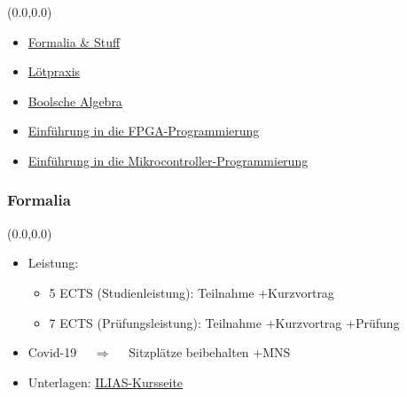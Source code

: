 \documentclass[aspectratio=169, 14pt]{beamer}
\begin{document}
\begin{frame}[label=inhalt]
    \begin{textblock*}{2\paperwidth}(0.0\paperwidth,0.0\paperheight)
        \vspace*{1.9cm}
        \begin{itemize}
            \setlength\itemsep{16pt}
            \item \hyperlink{stuff}{Formalia \& Stuff}
            \item \hyperlink{loetuebung}{Lötpraxis}
            \item \hyperlink{boolschealgebra}{Boolsche Algebra}
            \item \hyperlink{fpga}{Einführung in die FPGA-Programmierung}
            \item \hyperlink{mikrocontroller}{Einführung in die Mikrocontroller-Programmierung}
        \end{itemize}
    \end{textblock*}
    \setcounter{framenumber}{0}
\end{frame}


\begin{frame}[label=stuff]
    \addtocounter{framenumber}{-1}
\end{frame}


\begin{frame}
    \frametitle{Formalia}
    \begin{textblock*}{2\paperwidth}(0.0\paperwidth,0.0\paperheight)
        \vspace*{2.0cm}
        \begin{itemize}
            \setlength\itemsep{16pt}
            \item Leistung:
            \begin{itemize}
                \item 5 ECTS (Studienleistung): Teilnahme +Kurzvortrag
                \item 7 ECTS (Prüfungsleistung): Teilnahme +Kurzvortrag +Prüfung
            \end{itemize}
            \item Covid-19 $\quad\Rightarrow\quad$ Sitzplätze beibehalten +MNS
            \item Unterlagen: \textcolor{uniblau}{\href{https://ilias.uni-freiburg.de/ilias.php?ref_id=2285967&cmdClass=ilrepositorygui&cmdNode=yj&baseClass=ilrepositorygui}{ILIAS-Kursseite}}
        \end{itemize}
    \end{textblock*}
    \framenumber
\end{frame}
\end{document}
